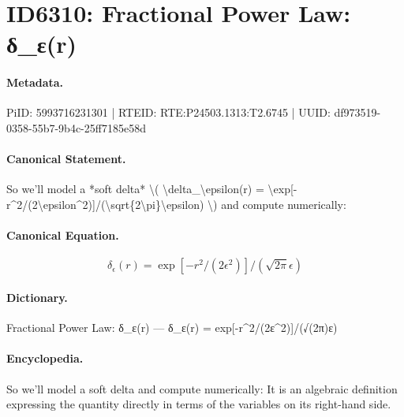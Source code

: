 \section*{ID6310: Fractional Power Law: δ\_ε(r)}
\paragraph{Metadata.}
PiID: 5993716231301 | RTEID: RTE:P24503.1313:T2.6745 | UUID: df973519-0358-55b7-9b4c-25ff7185e58d

\paragraph{Canonical Statement.}
So we’ll model a *soft delta* \textbackslash{}( \textbackslash{}delta\_\textbackslash{}epsilon(r) = \textbackslash{}exp[-r\textasciicircum{}2/(2\textbackslash{}epsilon\textasciicircum{}2)]/(\textbackslash{}sqrt\{2\textbackslash{}pi\}\textbackslash{}epsilon) \textbackslash{}) and compute numerically:

\paragraph{Canonical Equation.}
\[
\delta_\epsilon(r) = \exp[-r^2/(2\epsilon^2)]/(\sqrt{2\pi}\epsilon)
\]

\paragraph{Dictionary.}
Fractional Power Law: δ\_ε(r) — δ\_ε(r) = exp[-r\textasciicircum{}2/(2ε\textasciicircum{}2)]/(√(2π)ε)

\paragraph{Encyclopedia.}
So we’ll model a soft delta and compute numerically: It is an algebraic definition expressing the quantity directly in terms of the variables on its right-hand side.
